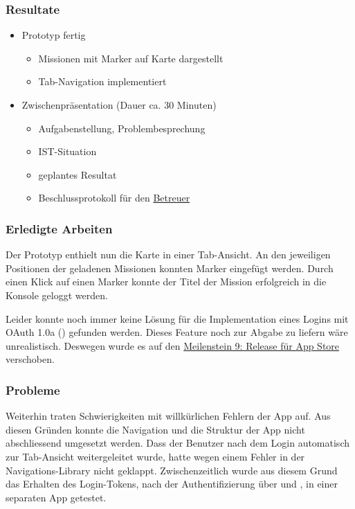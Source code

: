 \subsubsection{Resultate}
\begin{itemize}
	\item {} Prototyp fertig
	\begin{itemize}
		\item Missionen mit Marker auf Karte dargestellt
		\item Tab-Navigation implementiert
	\end{itemize}
	\item Zwischenpräsentation (Dauer ca. 30 Minuten)
	\begin{itemize}
		\item Aufgabenstellung, Problembesprechung
		\item IST-Situation
		\item geplantes Resultat
		\item Beschlussprotokoll für den \hyperref[pm-team]{Betreuer}
	\end{itemize}
\end{itemize}

\subsubsection{Erledigte Arbeiten}
Der Prototyp enthielt nun die Karte in einer Tab-Ansicht. 
An den jeweiligen Positionen der geladenen Missionen konnten Marker eingefügt werden.
Durch einen Klick auf einen Marker konnte der Titel der Mission erfolgreich in die Konsole geloggt werden.

Leider konnte noch immer keine Lösung für die Implementation eines Logins mit \gls{OAuth} 1.0a () gefunden werden.
Dieses Feature noch zur Abgabe zu liefern wäre unrealistisch.
Deswegen wurde es auf den \hyperref[pm-ms9]{Meilenstein 9: Release für App Store} verschoben.

\subsubsection{Probleme}
Weiterhin traten Schwierigkeiten mit willkürlichen Fehlern der  App auf. 
Aus diesen Gründen konnte die Navigation und die Struktur der App nicht abschliessend umgesetzt werden.
Dass der Benutzer nach dem Login automatisch zur Tab-Ansicht weitergeleitet wurde, hatte wegen einem Fehler in der Navigations-\gls{Library} nicht geklappt.
Zwischenzeitlich wurde aus diesem Grund das Erhalten des Login-Tokens, nach der Authentifizierung über  und , in einer separaten App getestet.


